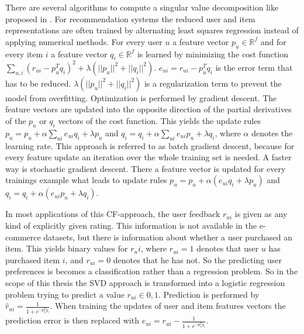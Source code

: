 \documentclass[10pt]{reportMaster}
\begin{document}
There are several algorithms to compute a singular value decomposition like proposed in \cite{svdGolubSolution}.
For recommendation systems the reduced user and item representations are often trained by alternating least squares regression instead of applying numerical methods. %
For every user $u$ a feature vector $p_u \in \mathds{R}^f$ and for every item $i$ a feature vector $q_i \in \mathds{R}^f$ is learned by minimizing the cost function $\sum_{u, i}{(r_{ui} - p_u^T q_i)^2 + \lambda (||p_u||^2 + ||q_i||^2)}$.
$e_{ui} = r_{ui} - p_u^T q_i$ is the error term that has to be reduced.
$\lambda (||p_u||^2 + ||q_i||^2)$ is a regularization term to prevent the model from overfitting.
Optimization is performed by gradient descent.
The feature vectors are updated into the opposite direction of the partial derivatives of the $p_u$ or $q_i$ vectors of the cost function.
This yields the update rules $p_u = p_u + \alpha \sum_{ui}{e_{ui} q_i + \lambda p_u}$ and $q_i = q_i + \alpha \sum_{ui}{e_{ui} p_u + \lambda q_i}$, where $\alpha$ denotes the learning rate.
This approach is referred to as batch gradient descent, because for every feature update an iteration over the whole training set is needed.
A faster way is stochastic gradient descent. %
There a feature vector is updated for every trainings example what leads to update rules $p_u = p_u + \alpha (e_{ui} q_i + \lambda p_u)$ and $q_i = q_i + \alpha (e_{ui} p_u + \lambda q_i)$.

In most applications of this CF-approach, the user feedback $r_{ui}$ is given as any kind of explicitly given rating.
This information is not available in the e-commerce datasets, but there is information about whether a user purchased an item.
This yields binary values for $r_ui$, where $r_{ui} = 1$ denotes that user $u$ has purchased item $i$, and $r_{ui} = 0$ denotes that he has not.
So the predicting user preferences is becomes a classification rather than a regression problem.
So in the scope of this thesis the SVD approach is transformed into a logistic regression problem trying to predict a value $r_{ui} \in {0,1}$.
Prediction is performed by $\hat{r}_{ui} = \frac{1}{1 + e^{-p_u^Tq_i}}$.
When training the updates of user and item features vectors the prediction error is then replaced with $e_{ui} = r_{ui} - \frac{1}{1 + e^{-p_u^Tq_i}}$.
\end{document}
